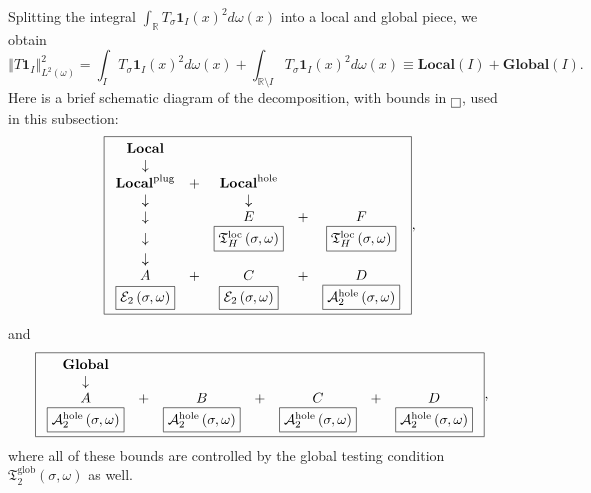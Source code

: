 \documentclass{amsart}%
\theoremstyle{plain}
\numberwithin{equation}{section}
\begin{document}
Splitting the integral $\int_{\mathbb{R}}T_{\sigma}\mathbf{1}_{I}\left(
x\right)  ^{2}d\omega\left(  x\right)  $ into a local and global piece, we
obtain%
\[
\left\Vert T\mathbf{1}_{I}\right\Vert _{L^{2}\left(  \omega\right)  }^{2}%
=\int_{I}T_{\sigma}\mathbf{1}_{I}\left(  x\right)  ^{2}d\omega\left(
x\right)  +\int_{\mathbb{R}\setminus I}T_{\sigma}\mathbf{1}_{I}\left(
x\right)  ^{2}d\omega\left(  x\right)  \equiv\mathbf{Local}\left(  I\right)
+\mathbf{Global}\left(  I\right)  .
\]
Here is a brief schematic diagram of the decomposition, with bounds in
$\fbox{}$, used in this subsection:%
\[
\fbox{$%
\begin{array}
[c]{ccccc}%
\mathbf{Local} &  &  &  & \\
\downarrow &  &  &  & \\
\mathbf{Local}^{\operatorname*{plug}} & + & \mathbf{Local}%
^{\operatorname*{hole}} &  & \\
\downarrow &  & \downarrow &  & \\
\downarrow &  & E & + & F\\
\downarrow &  & \fbox{$\mathfrak{T}_{H}^{\operatorname{loc}}\left(
\sigma,\omega\right)  $} &  & \fbox{$\mathfrak{T}_{H}^{\operatorname{loc}%
}\left(  \sigma,\omega\right)  $}\\
\downarrow &  &  &  & \\
A & + & C & + & D\\
\fbox{$\mathcal{E}_{2}\left(  \sigma,\omega\right)  $} &  & \fbox{$\mathcal{E}%
_{2}\left(  \sigma,\omega\right)  $} &  & \fbox{$\mathcal{A}_{2}%
^{\operatorname*{hole}}\left(  \sigma,\omega\right)  $}%
\end{array}
$}\text{,}%
\]
and%
\[
\text{ }\fbox{$%
\begin{array}
[c]{ccccccc}%
\mathbf{Global} &  &  &  &  &  & \\
\downarrow &  &  &  &  &  & \\
A & + & B & + & C & + & D\\
\fbox{$\mathcal{A}_{2}^{\operatorname*{hole}}\left(  \sigma,\omega\right)  $}
&  & \fbox{$\mathcal{A}_{2}^{\operatorname*{hole}}\left(  \sigma
,\omega\right)  $} &  & \fbox{$\mathcal{A}_{2}^{\operatorname*{hole}}\left(
\sigma,\omega\right)  $} &  & \fbox{$\mathcal{A}_{2}^{\operatorname*{hole}%
}\left(  \sigma,\omega\right)  $}%
\end{array}
$},
\]
where all of these bounds are controlled by the global testing condition
$\mathfrak{T}_{2}^{\operatorname*{glob}}\left(  \sigma,\omega\right)  $ as well.
\end{document}
